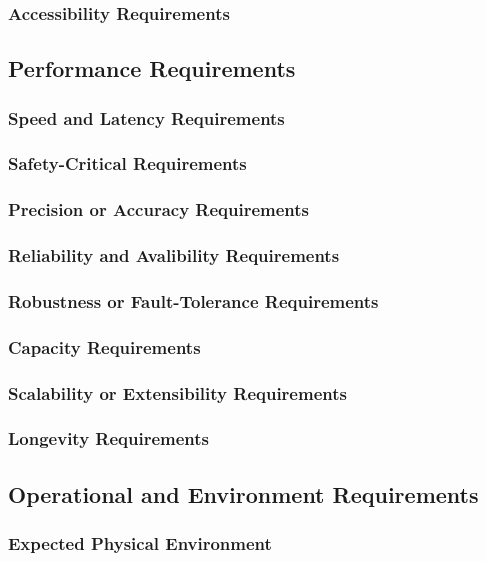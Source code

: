 \documentclass[12pt, titlepage]{article}
\begin{document}
    \subsubsection{Accessibility Requirements}

  \subsection{Performance Requirements}

    \subsubsection{Speed and Latency Requirements}
    \subsubsection{Safety-Critical Requirements}
    \subsubsection{Precision or Accuracy Requirements}
    \subsubsection{Reliability and Avalibility Requirements}
    \subsubsection{Robustness or Fault-Tolerance Requirements}
    \subsubsection{Capacity Requirements}
    \subsubsection{Scalability or Extensibility Requirements}
    \subsubsection{Longevity Requirements}
  
  \subsection{Operational and Environment Requirements}

	\subsubsection{Expected Physical Environment}
\end{document}
